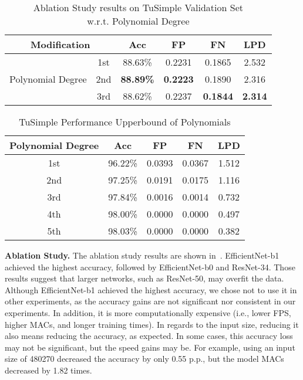 \documentclass[a4paper,conference]{IEEEtran}
\begin{document}
\begin{table}[h]
	\centering
	\caption{Ablation Study results on TuSimple Validation Set\protect\\ w.r.t. Polynomial Degree}
	\label{tab:ablation-study-poly-degree}
	\begin{tabular}{@{}ccccc|c@{}}
		\toprule
		\multicolumn{2}{c}{\textbf{Modification}}  & \textbf{Acc}  & \textbf{FP} & \textbf{FN} & \textbf{LPD}         \\ \midrule
		\multirow{3}{*}{Polynomial Degree} & 1st   & 88.63\%       & 0.2231      & 0.1865      & 2.532 \\
		                                   & 2nd   & \textbf{88.89\%}       & \textbf{0.2223}      & 0.1890      & 2.316 \\
		                                   & 3rd   & 88.62\%       & 0.2237      & \textbf{0.1844}      & \textbf{2.314} \\ \bottomrule
	\end{tabular}
\end{table} 
\begin{table}[h]
\centering
\caption{TuSimple Performance Upperbound of Polynomials}
\label{tab:upperbound}
\begin{tabular}{@{}cccc|c@{}}
\toprule
\textbf{Polynomial Degree} & \textbf{Acc} & \textbf{FP} & \textbf{FN} & \textbf{LPD} \\ \midrule
1st                        & 96.22\%                          & 0.0393                          & 0.0367  & 1.512                        \\
2nd                        & 97.25\%                          & 0.0191                          & 0.0175  & 1.116                        \\
3rd                        & 97.84\%                          & 0.0016                          & 0.0014  & 0.732                        \\
4th                        & 98.00\%                          & 0.0000                          & 0.0000  & 0.497                        \\
5th                        & 98.03\%                          & 0.0000                          & 0.0000  & 0.382                        \\ \bottomrule
\end{tabular}
\end{table} 
\textbf{Ablation Study.}
The ablation study results are shown in~. EfficientNet-b1 achieved the highest accuracy, followed by EfficientNet-b0 and ResNet-34. Those results suggest that larger networks, such as ResNet-50, may overfit the data. Although EfficientNet-b1 achieved the highest accuracy, we chose not to use it in other experiments, as the accuracy gains are not significant nor consistent in our experiments. In addition, it is more computationally expensive (i.e., lower FPS, higher MACs, and longer training times). In regards to the input size, reducing it also means reducing the accuracy, as expected. In some cases, this accuracy loss may not be significant, but the speed gains may be. For example, using an input size of 480270 decreased the accuracy by only 0.55 p.p., but the model MACs decreased by 1.82 times.
\end{document}
